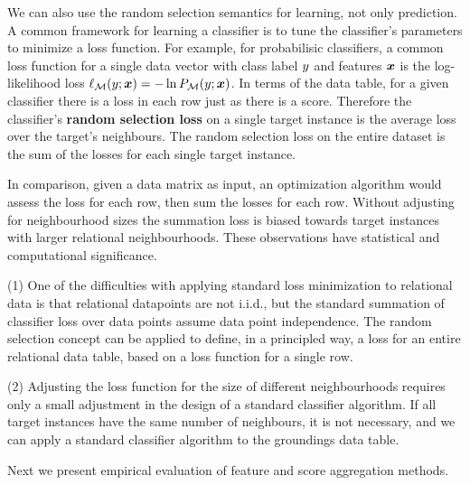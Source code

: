\documentclass[oribibl]{llncs}%
\begin{document}
We can also use the random selection semantics for learning, not only prediction.  A common framework for learning a classifier is to tune the classifier's parameters to minimize a loss function.  For example, for probabilisic classifiers, a common loss function for a single data vector with class label $y$ and features $\boldsymbol{x}$ is the log-likelihood loss $\ell_{\mathcal{M}}(y;\boldsymbol{x}) = -\ln P_{\mathcal{M}}(y;\boldsymbol{x})$. In terms of the data table, for a given classifier there is a loss in each row just as there is a score. Therefore the classifier's \textbf{random selection loss} on a single target instance is the average loss over the target's neighbours. The random selection loss on the entire dataset is the sum of the losses for each single target instance. 

In comparison, given a data matrix as input, an optimization algorithm would assess the loss for each row, then sum the losses for each row.  Without adjusting for neighbourhood sizes the summation loss is biased towards target instances with larger relational neighbourhoods. These observations have statistical and computational significance.  

(1) One of the difficulties with applying standard loss minimization to relational data is that relational datapoints are not i.i.d., but the standard summation of classifier loss over data points assume  data point independence. The random selection concept can be applied to define, in a principled way, a loss for an entire relational data table, based on a loss function for a single row.  

(2) Adjusting the loss function for the size of different neighbourhoods requires only a small adjustment in the design of a standard classifier algorithm. If all target instances have the same number of neighbours, it is not necessary, and we can apply a standard classifier algorithm to the groundings data table.

Next we present empirical evaluation of feature and score aggregation methods.
\end{document}
